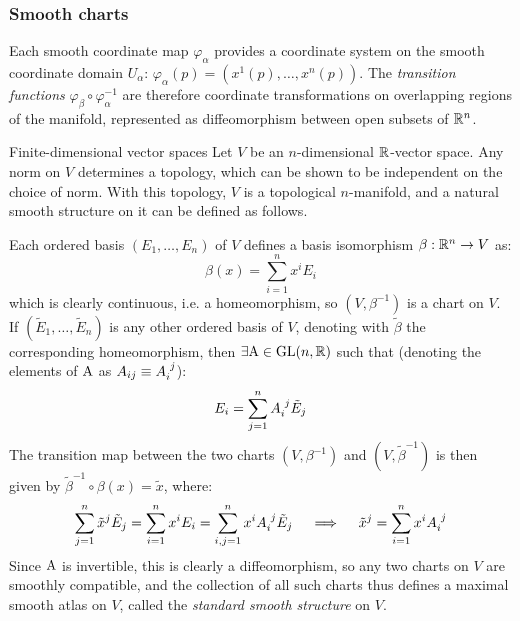 \subsubsection{Smooth charts}

Each smooth coordinate map $ \varphi_{\alpha} $ provides a coordinate system on the smooth coordinate domain $ U_{\alpha} $: $ \varphi_{\alpha}(p) = \left( x^1(p), \dots, x^n(p) \right) $. The \emph{transition functions} $ \varphi_{\beta} \circ \varphi_{\alpha}^{-1} $ are therefore coordinate transformations on overlapping regions of the manifold, represented as diffeomorphism between open subsets of $ \mathbb{R}^n $.

\begin{example}{Finite-dimensional vector spaces}{}
  Let $ V $ be an $ n $-dimensional $ \mathbb{R} $-vector space. Any norm on $ V $ determines a topology, which can be shown to be independent on the choice of norm. With this topology, $ V $ is a topological $ n $-manifold, and a natural smooth structure on it can be defined as follows.

  Each ordered basis $ (E_1 , \dots , E_n) $ of $ V $ defines a basis isomorphism $ \beta : \mathbb{R}^n \rightarrow V $ as:
  \begin{equation*}
    \beta(x) = \sum_{i = 1}^n x^i E_i
  \end{equation*}
  which is clearly continuous, i.e. a homeomorphism, so $ (V , \beta^{-1}) $ is a chart on $ V $. If $ (\tilde{E}_1 , \dots , \tilde{E}_n) $ is any other ordered basis of $ V $, denoting with $ \tilde{\beta} $ the corresponding homeomorphism, then $ \exists \mathrm{A} \in \mathrm{GL}(n,\mathbb{R}) $ such that (denoting the elements of $ \mathrm{A} $ as $ A_{ij} \equiv \tensor{A}{_i^j} $):
  \begin{equation*}
    E_i = \sum_{j = 1}^n \tensor{A}{_i^j} \tilde{E}_j
  \end{equation*}
  The transition map between the two charts $ (V , \beta^{-1}) $ and $ (V , \tilde{\beta}^{-1}) $ is then given by $ \tilde{\beta}^{-1} \circ \beta(x) = \tilde{x} $, where:
  \begin{equation*}
    \sum_{j = 1}^n \tilde{x}^j \tilde{E}_j = \sum_{i = 1}^n x^i E_i = \sum_{i,j = 1}^n x^i \tensor{A}{_i^j} \tilde{E}_j
    \quad \implies \quad
    \tilde{x}^j = \sum_{i = 1}^n x^i \tensor{A}{_i^j}
  \end{equation*}
  Since $ \mathrm{A} $ is invertible, this is clearly a diffeomorphism, so any two charts on $ V $ are smoothly compatible, and the collection of all such charts thus defines a maximal smooth atlas on $ V $, called the \emph{standard smooth structure} on $ V $.
\end{example}

